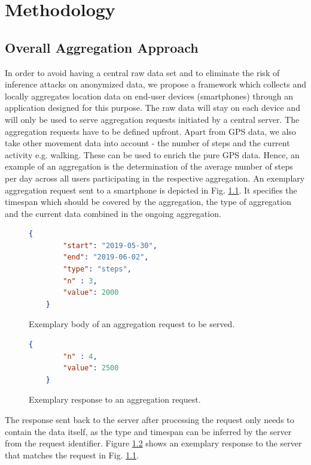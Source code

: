 \chapter{Methodology}\label{chapter:method}
\section{Overall Aggregation Approach}
In order to avoid having a central raw data set and to eliminate the risk of inference attacks on anonymized data, we propose a framework which collects and locally aggregates location data on end-user devices (smartphones) through an application designed for this purpose. The raw data will stay on each device and will only be used to serve aggregation requests initiated by a central server. The aggregation requests have to be defined upfront. Apart from GPS data, we also take other movement data into account - the number of steps and the current activity e.g. walking. These can be used to enrich the pure GPS data. Hence, an example of an aggregation is the determination of the average number of steps per day across all users participating in the respective aggregation. An exemplary aggregation request sent to a smartphone is depicted in Fig. \ref{incoming-aggregation-request}. It specifies the timespan which should be covered by the aggregation, the type of aggregation and the current data combined in the ongoing aggregation.

\begin{figure}[h!]
	\begin{lstlisting}[language=json,firstnumber=1]
	{
		"start": "2019-05-30",
		"end": "2019-06-02",
		"type": "steps",
		"n" : 3,
		"value": 2000
	}
	\end{lstlisting}
	\caption{Exemplary body of an aggregation request to be served.}
	\label{incoming-aggregation-request}
\end{figure}

\begin{figure}[h!]
	\begin{lstlisting}[language=json,firstnumber=1]
	{
		"n" : 4,
		"value": 2500
	}
	\end{lstlisting}
	\caption{Exemplary response to an aggregation request.}
	\label{outgoing-aggregation-response}
\end{figure}

The response sent back to the server after processing the request only needs to contain the data itself, as the type and timespan can be inferred by the server from the request identifier. Figure \ref{outgoing-aggregation-response} shows an exemplary response to the server that matches the request in Fig. \ref{incoming-aggregation-request}.


